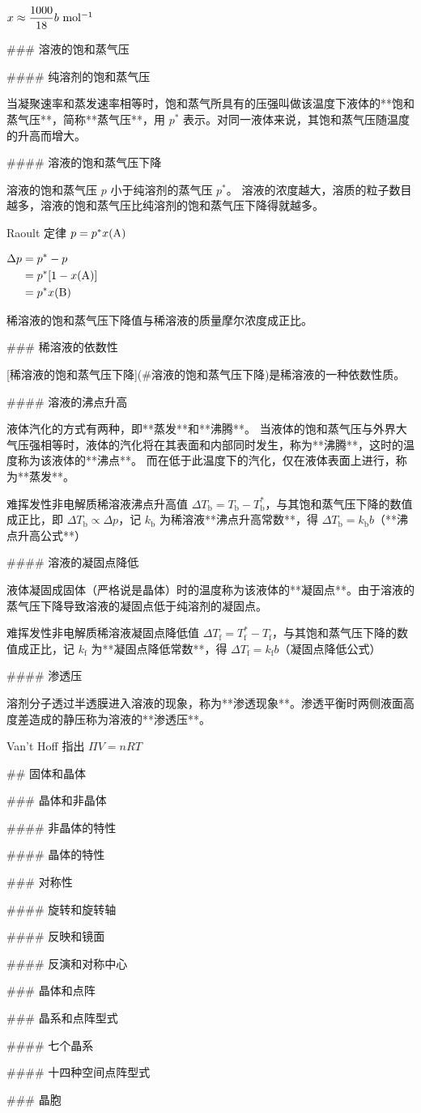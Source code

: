 $x\approx \dfrac{1000}{18}b~{\rm mol^{-1}}$

### 溶液的饱和蒸气压

#### 纯溶剂的饱和蒸气压

当凝聚速率和蒸发速率相等时，饱和蒸气所具有的压强叫做该温度下液体的**饱和蒸气压**，简称**蒸气压**，用 $p^*$ 表示。对同一液体来说，其饱和蒸气压随温度的升高而增大。

#### 溶液的饱和蒸气压下降

溶液的饱和蒸气压 $p$ 小于纯溶剂的蒸气压 $p^*$。
溶液的浓度越大，溶质的粒子数目越多，溶液的饱和蒸气压比纯溶剂的饱和蒸气压下降得就越多。

Raoult 定律 $p=p^*x({\rm A})$

$\begin{align}\Delta p &= p^*-p\\&=p^*[1-x({\rm A})]\\&=p^*x({\rm B})\end{align}$

稀溶液的饱和蒸气压下降值与稀溶液的质量摩尔浓度成正比。

### 稀溶液的依数性

[稀溶液的饱和蒸气压下降](#溶液的饱和蒸气压下降)是稀溶液的一种依数性质。

#### 溶液的沸点升高

液体汽化的方式有两种，即**蒸发**和**沸腾**。 当液体的饱和蒸气压与外界大气压强相等时，液体的汽化将在其表面和内部同时发生，称为**沸腾**，这时的温度称为该液体的**沸点**。 而在低于此温度下的汽化，仅在液体表面上进行，称为**蒸发**。

难挥发性非电解质稀溶液沸点升高值 $\Delta T_\mathrm{b}=T_\mathrm{b}-T_\mathrm{b}^*$，与其饱和蒸气压下降的数值成正比，即 $\Delta T_\mathrm{b} \propto \Delta p$，记 $k_\mathrm{b}$ 为稀溶液**沸点升高常数**，得 $\Delta T_\mathrm{b}=k_\mathrm{b}b$（**沸点升高公式**）

#### 溶液的凝固点降低

液体凝固成固体（严格说是晶体）时的温度称为该液体的**凝固点**。由于溶液的蒸气压下降导致溶液的凝固点低于纯溶剂的凝固点。

难挥发性非电解质稀溶液凝固点降低值 $\Delta T_\mathrm{f}=T_\mathrm{f}^*-T_\mathrm{f}$，与其饱和蒸气压下降的数值成正比，记 $k_\mathrm{f}$ 为**凝固点降低常数**，得 $\Delta T_\mathrm{f}=k_\mathrm{f}b$（凝固点降低公式）

#### 渗透压

溶剂分子透过半透膜进入溶液的现象，称为**渗透现象**。渗透平衡时两侧液面高度差造成的静压称为溶液的**渗透压**。

Van’t Hoff 指出 $\mathit{\Pi}V = nRT$

## 固体和晶体

### 晶体和非晶体

#### 非晶体的特性

#### 晶体的特性

### 对称性

#### 旋转和旋转轴

#### 反映和镜面

#### 反演和对称中心

### 晶体和点阵

### 晶系和点阵型式

#### 七个晶系

#### 十四种空间点阵型式

### 晶胞
